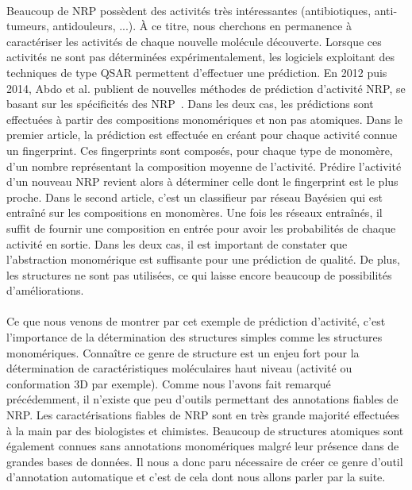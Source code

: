 \documentclass[12pt,french,twoside]{report}
\begin{document}
\paragraph{}Beaucoup de NRP possèdent des activités très intéressantes (antibiotiques, anti-tumeurs, antidouleurs, ...).
À ce titre, nous cherchons en permanence à caractériser les activités de chaque nouvelle molécule découverte.
Lorsque ces activités ne sont pas déterminées expérimentalement, les logiciels exploitant des techniques de type QSAR permettent d'effectuer une prédiction.
En 2012 puis 2014, Abdo et al. publient de nouvelles méthodes de prédiction d'activité NRP, se basant sur les spécificités des NRP~\cite{abdo_new_2012, abdo_prediction_2014}.
Dans les deux cas, les prédictions sont effectuées à partir des compositions monomériques et non pas atomiques.
Dans le premier article, la prédiction est effectuée en créant pour chaque activité connue un fingerprint.
Ces fingerprints sont composés, pour chaque type de monomère, d'un nombre représentant la composition moyenne de l'activité. 
Prédire l'activité d'un nouveau NRP revient alors à déterminer celle dont le fingerprint est le plus proche.
Dans le second article, c'est un classifieur par réseau Bayésien qui est entraîné sur les compositions en monomères.
Une fois les réseaux entraînés, il suffit de fournir une composition en entrée pour avoir les probabilités de chaque activité en sortie.
Dans les deux cas, il est important de constater que l'abstraction monomérique est suffisante pour une prédiction de qualité.
De plus, les structures ne sont pas utilisées, ce qui laisse encore beaucoup de possibilités d'améliorations.

\paragraph{}Ce que nous venons de montrer par cet exemple de prédiction d'activité, c'est l'importance de la détermination des structures simples comme les structures monomériques.
Connaître ce genre de structure est un enjeu fort pour la détermination de caractéristiques moléculaires haut niveau (activité ou conformation 3D par exemple).
Comme nous l'avons fait remarqué précédemment, il n'existe que peu d'outils permettant des annotations fiables de NRP.
Les caractérisations fiables de NRP sont en très grande majorité effectuées à la main par des biologistes et chimistes.
Beaucoup de structures atomiques sont également connues sans annotations monomériques malgré leur présence dans de grandes bases de données.
Il nous a donc paru nécessaire de créer ce genre d'outil d'annotation automatique et c'est de cela dont nous allons parler par la suite.
\end{document}
